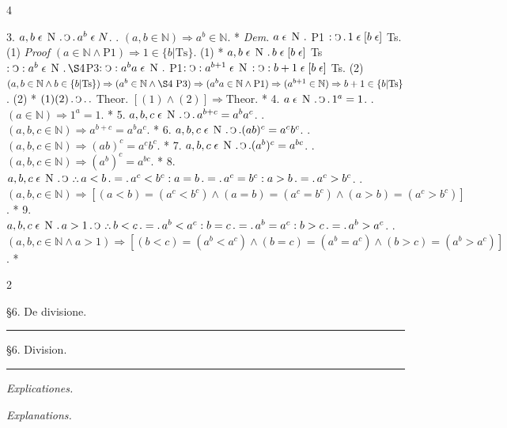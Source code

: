 \documentclass{book}
\newcommand{\s}{\switchcolumn} %
\newcommand{\C}{\mathop{\sbox0{$\displaystyle$$\reflectbox{C}$} %
\raisebox{-\height+\ht0-0.05cm}[\ht0][\dp0]{\scalebox{0.8}[0.8]{\copy0}}}\displaylimits} %
\newcommand{\p}{\mathop{\sbox0{$\displaystyle$$.$}
\raisebox{-\height+\ht0}[\ht0][\dp0]{\scalebox{1}[1]{\copy0}}}\displaylimits} %
\newcommand{\pppNoSpace}{\leavevmode\lower0ex\hbox{.}\kern-0.1em\raise0.7ex\hbox{.}\kern-0.1em\lower0ex\hbox{.}} %
\newcommand{\ppp}{\thinspace \pppNoSpace\thinspace} %
\newcommand{\larger}{\mathrel{>}}
\newcommand{\smaller}{\mathrel{<}}
\newcommand{\smallIn}{\ensuremath{\mathrel{\epsilon}}}
\newcommand{\N}{\mathop{\thinspace \text{N} \thinspace}}
\renewcommand{\rightarrow}{\Rightarrow}
\newcommand\peanoHeadingSmall[1]{ \vspace{0.75cm} \textit{#1} \nopagebreak[4]

\vspace{0.25cm} \nopagebreak[1]}
\newcommand\peanoHeadingMedium[1]{ \vspace{1cm} {\Large #1} \nopagebreak[4]

  \noindent\rule{1cm}{0.4pt} \nopagebreak[1]}
\newenvironment{translateTwoCol}
               { %
                 \columnratio{0.5, 0.5}
                 \begin{paracol}{2}
                 \newcommand{\LAT}{\switchcolumn[0]*}
                 \newcommand{\ENG}{\switchcolumn[1]}
               }
               { %
                 \let\ENG\undefined
                 \let\LAT\undefined
                 \end{paracol}
               }
\newenvironment{translateFourCol}[4]
               { %
                 \setcolumnwidth{#1\fill/1em, #2\fill/\columnsep, #3\fill/1em, #4\fill}
                 \begin{paracol}{4}
                 \newcommand{\LAT}{\switchcolumn[0]*}
                 \newcommand{\ENG}{\switchcolumn[2]}
               }
               { %
                 \let\ENG\undefined
                 \let\LAT\undefined
                 \end{paracol}
               }
\begin{document}
\begin{translateFourCol}{0.08}{0.42}{0.08}{0.42}
\raggedright
3. \s $a,b \smallIn \N \p \C \p a^{b} \smallIn N$.
\ENG
3. \s $(a,b \in \mathbb{N}) \rightarrow a^{b} \in \mathbb{N}$.
\LAT
\emph{Dem.} \s $a \smallIn \N \p$ P1 $: \C \p 1 \smallIn [b \smallIn]$ Ts. \hfill (1)
\ENG
\emph{Proof} \s $(a \in \mathbb{N} \wedge \text{P1}) \rightarrow 1 \in \{ b | \text{Ts} \}$. \hfill (1)
\LAT
\s $a,b \smallIn \N \p b \smallIn [b \smallIn]$ Ts $: \C : a^b \smallIn \N \p \S4 $P3$ : \C : a^b a \smallIn \N \p$ P1$: \C : a^{b+1} \smallIn \N : \C : b + 1 \smallIn [b \smallIn]$ Ts. \hfill (2)
\ENG
\s $(a,b \in \mathbb{N} \wedge b \in \{ b | \text{Ts} \}) \rightarrow (a^b \in \mathbb{N} \wedge \S4\ \text{P3}) \rightarrow (a^b a \in \mathbb{N} \wedge \text{P1}) \rightarrow (a^{b+1} \in \mathbb{N}) \rightarrow b + 1 \in \{ b | \text{Ts} \}$. \hfill (2)
\LAT
\s $(1)(2) \p \C \p.$ Theor.
\ENG
\s $[(1) \wedge (2)] \rightarrow \text{Theor}$.
\LAT
4. \s $a \smallIn \N \p \C \p 1^{a} = 1$.
\ENG
4. \s $(a \in \mathbb{N}) \rightarrow 1^{a} = 1$.
\LAT
5. \s $a,b,c \smallIn \N \p \C \p a^{b + c} = a^b a^c$.
\ENG
5. \s $(a,b,c \in \mathbb{N}) \rightarrow a^{b + c} = a^b a^c$.
\LAT
6. \s $a,b,c \smallIn \N \p \C \p (ab)^c = a^c b^c$.
\ENG
6. \s $(a,b,c \in \mathbb{N}) \rightarrow (ab)^c = a^c b^c$.
\LAT
7. \s $a,b,c \smallIn \N \p \C \p (a^b)^c = a^{bc}$.
\ENG
7. \s $(a,b,c \in \mathbb{N}) \rightarrow (a^b)^c = a^{bc}$.
\LAT
8. \s $a,b,c \smallIn \N \p \C \ppp a \smaller b \p = \p a^c \smaller b^c : a = b \p = \p a^c = b^c : a \larger b \p = \p a^c \larger b^c$.
\ENG
8. \s $(a,b,c \in \mathbb{N}) \rightarrow [(a < b) = (a^c < b^c) \wedge (a = b) = (a^c = b^c) \wedge (a > b) = (a^c > b^c)]$.
\LAT
9. \s $a,b,c \smallIn \N \p a \larger 1 \p \C \ppp b \smaller c \p = \p a^b \smaller a^c : b = c \p = \p a^b = a^c : b \larger c \p = \p a^b \larger a^c$.
\ENG
9. \s $(a,b,c \in \mathbb{N} \wedge a > 1) \rightarrow [(b < c) = (a^b < a^c) \wedge (b = c) = (a^b = a^c) \wedge (b > c) = (a^b > a^c)]$.
\LAT
\end{translateFourCol}

\begin{translateTwoCol}
\centering
{}
{}
\peanoHeadingMedium{\S6. De divisione.}
\s
\peanoHeadingMedium{\S6. Division.}
\s*
{}
{}
\peanoHeadingSmall{Explicationes.}
\s
\peanoHeadingSmall{Explanations.}
\end{translateTwoCol}
\end{document}
